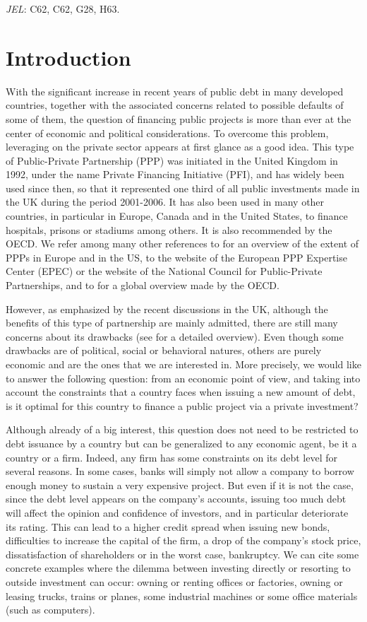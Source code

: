 \documentclass{svjour3}
\begin{document}
{\it JEL}: C62, C62, G28, H63.
\section{Introduction}

With the significant increase in recent years of public debt in many developed countries, together with the associated concerns related to possible defaults of some of them, the question of financing public projects is more than ever at the center of economic and political considerations. To overcome this problem, leveraging on the private sector appears at first glance as a good idea. This type of Public-Private Partnership (PPP) was initiated in the United Kingdom in 1992, under the name Private Financing Initiative (PFI), and has widely been used since then, so that it represented one third of all public investments made in the UK during the period 2001-2006. It has also been used in many other countries, in particular in Europe, Canada and in the United States, to finance hospitals, prisons or stadiums among others. It is also recommended by the OECD. We refer among many other references to \cite{EFG} for an overview of the extent of PPPs in Europe and in the US, to the website of the European PPP Expertise Center (EPEC) or the website of the National Council for Public-Private Partnerships, and to \cite{OECD} for a global overview made by the OECD.

However, as emphasized by the recent discussions in the UK, although the benefits of this type of partnership are mainly admitted, there are still many concerns about its drawbacks (see \cite{WBI} for a detailed overview). Even though some drawbacks are of political, social or behavioral natures, others are purely economic and are the ones that we are interested in. More precisely, we would like to answer the following question: from an economic point of view, and taking into account the constraints that a country faces when issuing a new amount of debt, is it optimal for this country to finance a public project via a private investment?

Although already of a big interest, this question does not need to be restricted to debt issuance by a country but can be generalized to any economic agent, be it a country or a firm. Indeed, any firm has some constraints on its debt level for several reasons. In some cases, banks will simply not allow a company to borrow enough money to sustain a very expensive project. But even if it is not the case, since the debt level appears on the company's accounts, issuing too much debt will affect the opinion and confidence of investors, and in particular deteriorate its rating. This can lead to a higher credit spread when issuing new bonds, difficulties to increase the capital of the firm, a drop of the company's stock price, dissatisfaction of shareholders or in the worst case, bankruptcy. We can cite some concrete examples where the dilemma between investing directly or resorting to outside investment can occur: owning or renting offices or factories, owning or leasing trucks, trains or planes, some industrial machines or some office materials (such as computers).
\end{document}
